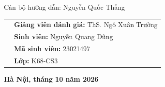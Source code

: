 \begin{titlepage}
\vspace{0.75cm}
\begin{center}
{\fontsize{12}{16}\selectfont Cán bộ hướng dẫn: \color{coveraccent}Nguyễn Quốc Thắng\par}
\end{center}

\vfill
\begin{tabularx}{0.82\textwidth}{@{}X X@{}}
&
{\fontsize{12}{16}\selectfont \textbf{Giảng viên đánh giá:} \color{coveraccent}ThS. Ngô Xuân Trường}\\[0.12cm]
&
{\fontsize{12}{16}\selectfont \textbf{Sinh viên:} \color{coveraccent}Nguyễn Quang Dũng}\\[-0.02cm]
&
{\fontsize{12}{16}\selectfont \textbf{Mã sinh viên:} \color{coveraccent}23021497}\\[-0.02cm]
&
{\fontsize{12}{16}\selectfont \textbf{Lớp:} \color{coveraccent}K68-CS3}
\end{tabularx}

\vfill
\begin{center}
{\fontsize{16}{20}\selectfont\bfseries Hà Nội, \color{coveraccent}tháng 10 năm 2026}
\end{center}
\end{titlepage}
\nopagecolor
\color{black}
\clearpage

